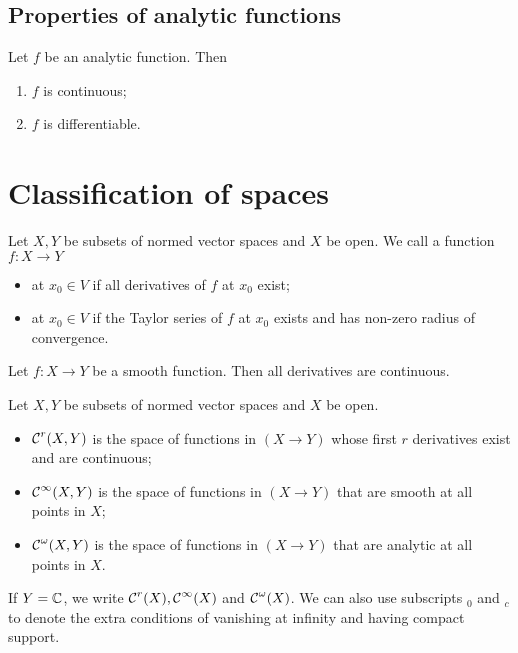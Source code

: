 \subsection{Properties of analytic functions}
\begin{proposition}
Let $f$ be an analytic function. Then
\begin{enumerate}
\item $f$ is continuous;
\item $f$ is differentiable.
\end{enumerate}
\end{proposition}

\section{Classification of spaces}
\begin{definition}
Let $X,Y$ be subsets of normed vector spaces and $X$ be open. We call a function $f: X\to Y$
\begin{itemize}
\item {} at $x_0\in V$ if all derivatives of $f$ at $x_0$ exist;
\item {} at $x_0\in V$ if the Taylor series of $f$ at $x_0$ exists and has non-zero radius of convergence.
\end{itemize}
\end{definition}
\begin{lemma}
Let $f: X\to Y$ be a smooth function. Then all derivatives are continuous.
\end{lemma}

\begin{definition}
Let $X,Y$ be subsets of normed vector spaces and $X$ be open.
\begin{itemize}
\item $\operatorname{\mathcal{C}}^r(X,Y)$ is the space of functions in $(X \to Y)$ whose first $r$ derivatives exist and are continuous;
\item $\operatorname{\mathcal{C}}^\infty(X,Y)$ is the space of functions in $(X \to Y)$ that are smooth at all points in $X$;
\item $\operatorname{\mathcal{C}}^\omega(X,Y)$ is the space of functions in $(X \to Y)$ that are analytic at all points in $X$.
\end{itemize}
If $Y = \mathbb{C}$, we write $\operatorname{\mathcal{C}}^r(X), \operatorname{\mathcal{C}}^\infty(X)$ and $\operatorname{\mathcal{C}}^\omega(X)$. We can also use subscripts $_0$ and $_c$ to denote the extra conditions of vanishing at infinity and having compact support.
\end{definition}




